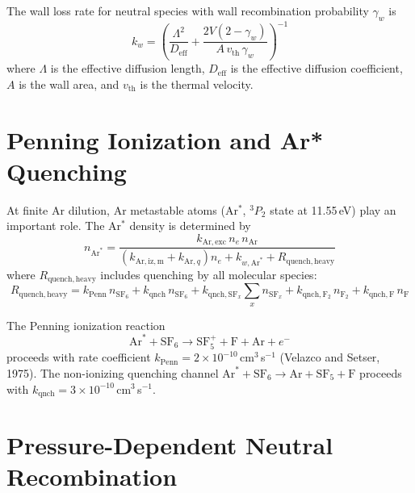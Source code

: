 \documentclass[11pt,a4paper]{article}
\newcommand{\SFx}{\mathrm{SF}_x}
\newcommand{\SFsix}{\mathrm{SF}_6}
\newcommand{\SFfive}{\mathrm{SF}_5}
\newcommand{\Ar}{\mathrm{Ar}}
\newcommand{\nelec}{n_e}
\begin{document}
The wall loss rate for neutral species with wall recombination probability $\gamma_w$ is
\begin{equation}
k_w = \left( \frac{\Lambda^2}{D_\mathrm{eff}} + \frac{2V(2-\gamma_w)}{A\, v_\mathrm{th}\, \gamma_w} \right)^{-1}
\end{equation}
where $\Lambda$ is the effective diffusion length, $D_\mathrm{eff}$ is the effective diffusion coefficient, $A$ is the wall area, and $v_\mathrm{th}$ is the thermal velocity.

\section{Penning Ionization and Ar* Quenching}

At finite Ar dilution, Ar metastable atoms (Ar$^*$, ${}^3P_2$ state at 11.55\,eV) play an important role.  The Ar$^*$ density is determined by
\begin{equation}
n_{\Ar^*} = \frac{k_{\Ar,\mathrm{exc}}\, \nelec\, n_\Ar}{(k_{\Ar,\mathrm{iz,m}} + k_{\Ar,q})\nelec + k_{w,\Ar^*} + R_\mathrm{quench,heavy}}
\end{equation}
where $R_\mathrm{quench,heavy}$ includes quenching by all molecular species:
\begin{equation}
R_\mathrm{quench,heavy} = k_\mathrm{Penn}\, n_{\SFsix} + k_\mathrm{qnch}\, n_{\SFsix} + k_{\mathrm{qnch},\SFx} \sum_x n_{\SFx} + k_{\mathrm{qnch},\mathrm{F}_2}\, n_{\mathrm{F}_2} + k_{\mathrm{qnch},\mathrm{F}}\, n_\mathrm{F}
\end{equation}

The Penning ionization reaction
\begin{equation}
\Ar^* + \SFsix \to \SFfive^+ + \mathrm{F} + \Ar + e^-
\end{equation}
proceeds with rate coefficient $k_\mathrm{Penn} = 2 \times 10^{-10}$\,cm$^3$\,s$^{-1}$ (Velazco and Setser, 1975).  The non-ionizing quenching channel $\Ar^* + \SFsix \to \Ar + \SFfive + \mathrm{F}$ proceeds with $k_\mathrm{qnch} = 3 \times 10^{-10}$\,cm$^3$\,s$^{-1}$.

\section{Pressure-Dependent Neutral Recombination}
\label{sec:troe}
\end{document}
